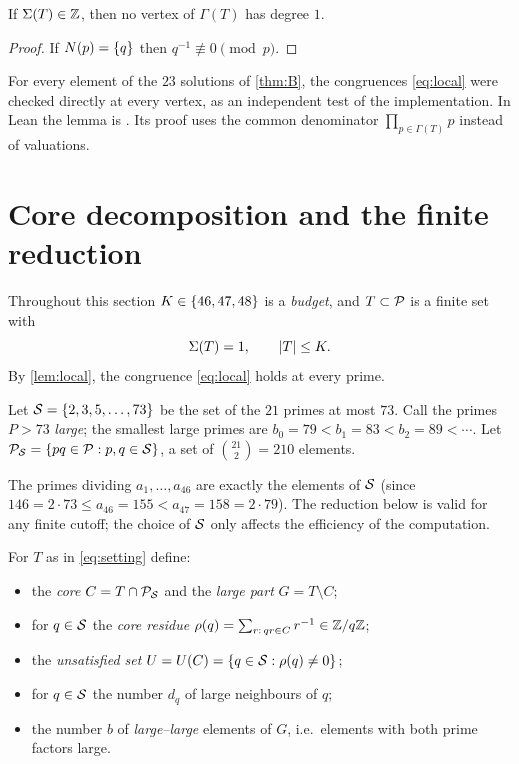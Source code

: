 \documentclass[11pt]{article}
\begin{document}
\begin{corollary}\label{cor:degree}
If $\Sigma(T)\in\mathbb{Z}$, then no vertex of $\Gamma(T)$ has degree $1$.
\end{corollary}

\begin{proof}
If $N(p)=\{q\}$ then $q^{-1}\not\equiv0\pmod p$.
\end{proof}

For every element of the $23$ solutions of \cref{thm:B}, the congruences \eqref{eq:local} were checked directly at every vertex, as an independent test of the implementation.
In Lean the lemma is . Its proof uses the common denominator $\prod_{p\in\Gamma(T)}p$ instead of valuations.

\section{Core decomposition and the finite reduction}\label{sec:core}

Throughout this section $K\in\{46,47,48\}$ is a \emph{budget}, and $T\subset\mathcal{P}$ is a finite set with
\begin{equation}\label{eq:setting}
\Sigma(T)=1,\qquad \lvert T\rvert\le K .
\end{equation}
By \cref{lem:local}, the congruence \eqref{eq:local} holds at every prime.

\begin{definition}
Let $\mathcal{S}=\{2,3,5,\dots,73\}$ be the set of the $21$ primes at most $73$. Call the primes $P>73$ \emph{large}; the smallest large primes are $b_0=79<b_1=83<b_2=89<\cdots$.
Let $\mathcal{P}_{\mathcal{S}}=\{pq\in\mathcal{P}: p,q\in\mathcal{S}\}$, a set of $\binom{21}{2}=210$ elements.
\end{definition}

The primes dividing $a_1,\dots,a_{46}$ are exactly the elements of $\mathcal{S}$ (since $146=2\cdot73\le a_{46}=155<a_{47}=158=2\cdot79$). The reduction below is valid for any finite cutoff; the choice of $\mathcal{S}$ only affects the efficiency of the computation.

\begin{definition}\label{def:core}
For $T$ as in \eqref{eq:setting} define:
\begin{itemize}
\item the \emph{core} $C=T\cap\mathcal{P}_{\mathcal{S}}$ and the \emph{large part} $G=T\setminus C$;
\item for $q\in\mathcal{S}$ the \emph{core residue} $\rho(q)=\sum_{r:\,qr\in C}r^{-1}\in\mathbb{Z}/q\mathbb{Z}$;
\item the \emph{unsatisfied set} $U=U(C)=\{q\in\mathcal{S}:\rho(q)\ne0\}$;
\item for $q\in\mathcal{S}$ the number $d_q$ of large neighbours of $q$;
\item the number $b$ of \emph{large--large} elements of $G$, i.e.\ elements with both prime factors large.
\end{itemize}
\end{definition}
\end{document}
